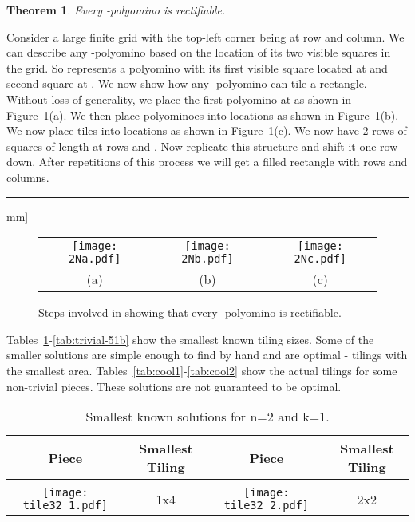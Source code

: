 \documentclass[10pt,a4paper]{article}
\newcommand{\BlackBox}{\rule{1.5ex}{1.5ex}}  \fi
\newenvironment{proof}{\par\noindent{\bf Proof\ }}{\hfill\BlackBox\2mm]}
\newtheorem{theorem}{Theorem}
\theoremstyle{definition}
\begin{document}
\begin{theorem}
Every -polyomino is rectifiable.
\end{theorem}
\begin{proof}
Consider a large finite grid with the top-left corner being at row and column. We can describe any 
-polyomino based on the location of its two visible squares in the grid. So  represents
a polyomino with its first visible square located at  and second square at .
We now show how any -polyomino can tile a rectangle. Without loss of generality, we place the first
polyomino at  as shown in Figure~\ref{fig:2N}(a). We then place  polyominoes into locations
 as shown in Figure~\ref{fig:2N}(b). We now place  tiles into locations
 as shown in Figure~\ref{fig:2N}(c). We now have 2 rows of squares of length  at
rows  and . Now replicate this structure and shift it one row down. After  repetitions of this process
we will get a filled rectangle with  rows and  columns.
\end{proof}

\begin{figure}[!htpb]
\centering
\begin{tabular}{ccc}
\texttt{[image: 2Na.pdf]} & \texttt{[image: 2Nb.pdf]} & \texttt{[image: 2Nc.pdf]} \\
(a) & (b) & (c)
\end{tabular}
\caption{Steps involved in showing that every -polyomino is rectifiable.}
\label{fig:2N}
\end{figure}

Tables~\ref{tab:trivial-21}-\ref{tab:trivial-51b} show the smallest known tiling sizes.
Some of the smaller solutions are simple enough to find by hand and are optimal - 
tilings with the smallest area.
Tables~\ref{tab:cool1}-\ref{tab:cool2} show the actual tilings for
some non-trivial pieces. These solutions are not guaranteed to be optimal.


\begin{table}[!htpb]
\centering
\begin{tabular}{|c|c|c|c|}
\hline
Piece & Smallest Tiling & Piece & Smallest Tiling\\ \hline
& & & \\ 
\texttt{[image: tile32\_1.pdf]} & 1x4 & \texttt{[image: tile32\_2.pdf]} & 2x2 \\ \hline
\end{tabular}
\caption{Smallest known solutions for n=2 and k=1.}
\label{tab:trivial-21}
\end{table}
\end{document}
